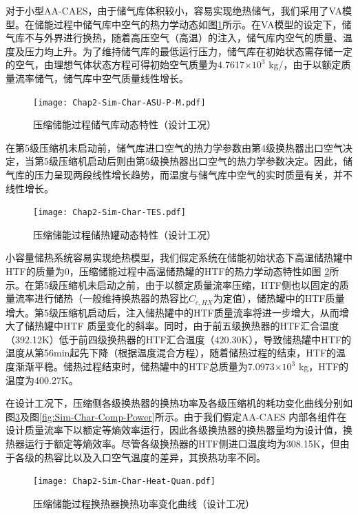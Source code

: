 对于小型AA-CAES，由于储气库体积较小，容易实现绝热储气，我们采用了VA模型。在储能过程中储气库中空气的热力学动态如图\ref{fig:Sim-Char-ASU-P-M}所示。在VA模型的设定下，储气库不与外界进行换热，随着高压空气（高温）的注入，储气库内空气的质量、温度及压力均上升。为了维持储气库的最低运行压力，储气库在初始状态需存储一定的空气，由理想气体状态方程可得初始空气质量为4.7617$\times10^3$ kg/，由于以额定质量流率储气，储气库中空气质量线性增长。

\begin{figure}[H] %
  \centering
  \texttt{[image: Chap2-Sim-Char-ASU-P-M.pdf]}
  \caption{压缩储能过程储气库动态特性（设计工况）}
  \label{fig:Sim-Char-ASU-P-M}
\end{figure}

在第5级压缩机未启动前，储气库进口空气的热力学参数由第4级换热器出口空气决定，当第5级压缩机启动后则由第5级换热器出口空气的热力学参数决定。因此，储气库的压力呈现两段线性增长趋势，而温度与储气库中空气的实时质量有关，并不线性增长。

\begin{figure}[H] %
  \centering
  \texttt{[image: Chap2-Sim-Char-TES.pdf]}
  \caption{压缩储能过程储热罐动态特性（设计工况）}
  \label{fig:Sim-Char-TES}
\end{figure}

小容量储热系统容易实现绝热模型，我们假定系统在储能初始状态下高温储热罐中HTF的质量为0，压缩储能过程中高温储热罐的HTF的热力学动态特性如图
\ref{fig:Sim-Char-TES}所示。在第5级压缩机未启动之前，由于以额定质量流率压缩，HTF侧也以固定的质量流率进行储热（一般维持换热器的热容比$C_{c,HX}$为定值），储热罐中的HTF质量增大。第5级压缩机启动后，注入储热罐中的HTF质量流率将进一步增大，从而增大了储热罐中HTF 质量变化的斜率。同时，由于前五级换热器的HTF汇合温度（392.12K）低于前四级换热器的HTF汇合温度（420.30K），导致储热罐中HTF的温度从第56min起先下降（根据温度混合方程），随着储热过程的结束，HTF的温度渐渐平稳。储热过程结束时，储热罐中的HTF总质量为7.0973$\times 10^3$ kg，HTF的温度为400.27K。

在设计工况下，压缩侧各级换热器的换热功率及各级压缩机的耗功变化曲线分别如图\ref{fig:Sim-Char-Heat-Quan}及图\ref{fig:Sim-Char-Comp-Power}所示。由于我们假定AA-CAES 内部各组件在设计质量流率下以额定等熵效率运行，因此各级换热器的换热器量均为设计值，换热器运行于额定等熵效率。尽管各级换热器的HTF侧进口温度均为308.15K，但由于各级的热容比以及入口空气温度的差异，其换热功率不同。
\begin{figure}[H] %
  \centering
  \texttt{[image: Chap2-Sim-Char-Heat-Quan.pdf]}
  \caption{压缩储能过程换热器换热功率变化曲线（设计工况）}
  \label{fig:Sim-Char-Heat-Quan}
\end{figure}

